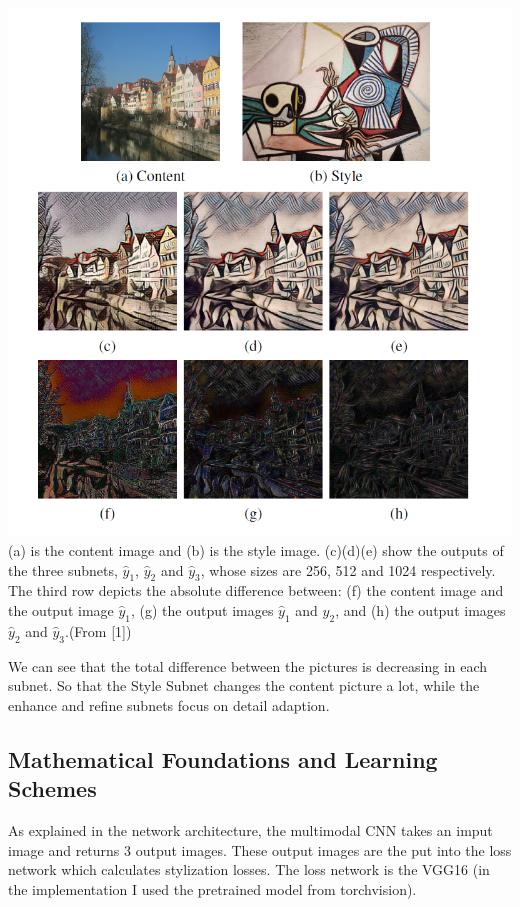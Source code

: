 \documentclass[11pt]{article}
\makeatletter
\def\maxwidth{\ifdim\Gin@nat@width>\linewidth\linewidth
    \else\Gin@nat@width\fi}
\let\Oldincludegraphics\includegraphics
\renewcommand{\includegraphics}[1]{\Oldincludegraphics[width=.8\maxwidth]{#1}}
\makeatother
\begin{document}
\includegraphics{refstruc.png} (a) is the content image and (b) is the
style image. (c)(d)(e) show the outputs of the three subnets,
\(\hat{y}_1\), \(\hat{y}_2\) and \(\hat{y}_3\), whose sizes are 256, 512
and 1024 respectively. The third row depicts the absolute difference
between: (f) the content image and the output image \(\hat{y}_1\), (g)
the output images \(\hat{y}_1\) and \(\hat{y}_2\), and (h) the output
images \(\hat{y}_2\) and \(\hat{y}_3\).(From {[}1{]})

We can see that the total difference between the pictures is decreasing
in each subnet. So that the Style Subnet changes the content picture a
lot, while the enhance and refine subnets focus on detail adaption.

\subsection{Mathematical Foundations and Learning
Schemes}\label{mathematical-foundations-and-learning-schemes}

As explained in the network architecture, the multimodal CNN takes an
imput image and returns 3 output images. These output images are the put
into the loss network which calculates stylization losses. The loss
network is the VGG16 (in the implementation I used the pretrained model
from torchvision).
\end{document}
